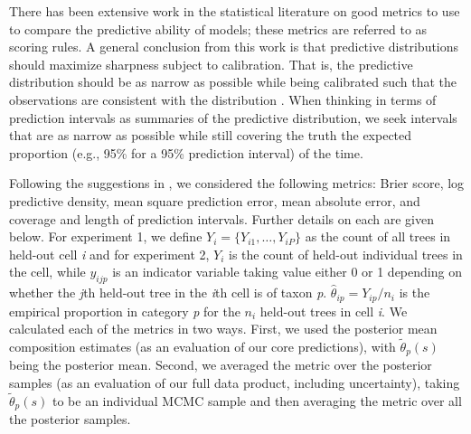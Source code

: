 \documentclass[10pt,letterpaper]{article}
\begin{document}
There has been extensive work in the statistical literature on good
metrics to use to compare the predictive ability of models; these
metrics are referred to as scoring rules. A general conclusion from
this work is that predictive distributions should maximize sharpness
subject to calibration. That is, the predictive distribution should
be as narrow as possible while being calibrated such that the observations
are consistent with the distribution \cite{Gnei:etal:2007}. When
thinking in terms of prediction intervals as summaries of the predictive
distribution, we seek intervals that are as narrow as possible while
still covering the truth the expected proportion (e.g., 95\% for a
95\% prediction interval) of the time. 

Following the suggestions in \cite{Gnei:etal:2007}, we considered
the following metrics: Brier score, log predictive density, mean square
prediction error, mean absolute error, and coverage and length of
prediction intervals. Further details on each are given below. For
experiment 1, we define $Y_{i}=\{Y_{i1},\ldots,Y_{iP}\}$ as the count
of all trees in held-out cell \emph{i} and for experiment 2, $Y_{i}$
is the count of held-out individual trees in the cell, while $y_{ijp}$
is an indicator variable taking value either 0 or 1 depending on whether
the \emph{j}th held-out tree in the \emph{i}th cell is of taxon \emph{p}. $\hat{\theta}_{ip}=Y_{ip}/n_{i}$
is the empirical proportion in category \emph{p} for the $n_{i}$ held-out
trees in cell \emph{i}. We calculated each of the metrics in two ways.
First, we used the posterior mean composition estimates (as an evaluation
of our core predictions), with $\tilde{\theta}_{p}(s)$ being the
posterior mean. Second, we averaged the metric over the posterior
samples (as an evaluation of our full data product, including uncertainty),
taking $\tilde{\theta}_{p}(s)$ to be an individual MCMC sample and
then averaging the metric over all the posterior samples. 
\end{document}
